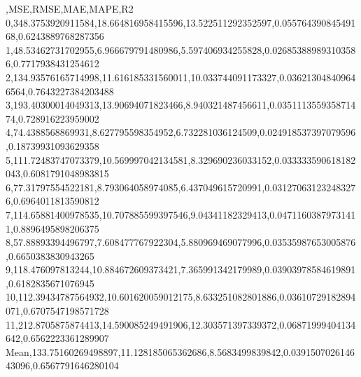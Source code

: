 ,MSE,RMSE,MAE,MAPE,R2
0,348.3753920911584,18.664816958415596,13.522511292352597,0.05576439084549168,0.6243889768287356
1,48.53462731702955,6.966679791480986,5.597406934255828,0.026853889893103586,0.7717938431254612
2,134.93576165714998,11.616185331560011,10.033744091173327,0.036213048409646564,0.7643227384203488
3,193.40300014049313,13.90694071823466,8.940321487456611,0.035111355935871474,0.728916223959002
4,74.4388568869931,8.627795598354952,6.732281036124509,0.024918537397079596,0.18739931093629358
5,111.72483747073379,10.569997042134581,8.329690236033152,0.033333590618182043,0.6081791048983815
6,77.31797554522181,8.793064058974085,6.437049615720991,0.031270631232483276,0.6964011813590812
7,114.65881400978535,10.707885599397546,9.04341182329413,0.04711603879731411,0.8896495898206375
8,57.88893394496797,7.608477767922304,5.880969469077996,0.03535987653005876,0.6650383830943265
9,118.476097813244,10.884672609373421,7.365991342179989,0.03903978584619891,0.6182835671076945
10,112.39434787564932,10.601620059012175,8.633251082801886,0.03610729182894071,0.6707547198571728
11,212.8705875874413,14.590085249491906,12.303571397339372,0.06871999404134642,0.6562223361289907
Mean,133.75160269498897,11.128185065362686,8.5683499839842,0.039150702614643096,0.6567791646280104
